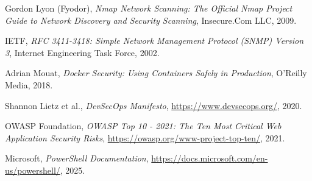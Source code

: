 \documentclass[11pt,a4paper]{report}
\begin{document}
\begin{thebibliography}{99}

Gordon Lyon (Fyodor),
\textit{Nmap Network Scanning: The Official Nmap Project Guide to Network Discovery and Security Scanning},
Insecure.Com LLC, 2009.

IETF,
\textit{RFC 3411-3418: Simple Network Management Protocol (SNMP) Version 3},
Internet Engineering Task Force, 2002.

Adrian Mouat,
\textit{Docker Security: Using Containers Safely in Production},
O'Reilly Media, 2018.

Shannon Lietz et al.,
\textit{DevSecOps Manifesto},
\url{https://www.devsecops.org/}, 2020.

OWASP Foundation,
\textit{OWASP Top 10 - 2021: The Ten Most Critical Web Application Security Risks},
\url{https://owasp.org/www-project-top-ten/}, 2021.

Microsoft,
\textit{PowerShell Documentation},
\url{https://docs.microsoft.com/en-us/powershell/}, 2025.

\end{thebibliography}
\end{document}
